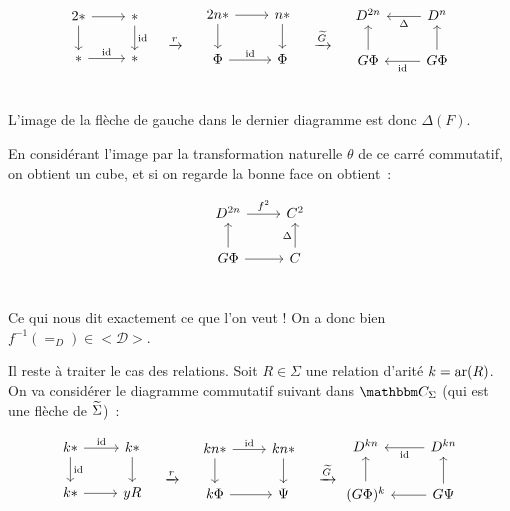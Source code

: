 \begin{pv}
    \[\begin{tikzcd}
        2\ast\arrow[r]\arrow[d] & \ast\arrow[d,"\id"] \\
        \ast\arrow[r, "\id"] & \ast \\
    \end{tikzcd}\quad\xrightarrow{r}\quad\begin{tikzcd}
        2n\ast\arrow[r]\arrow[d] & n\ast\arrow[d] \\
        \Phi\arrow[r,"\id"] & \Phi \\
    \end{tikzcd}\quad\xrightarrow{\tg}\quad\begin{tikzcd}
        D^{2n} & D^n\arrow[l,"\Delta"] \\
        G\Phi\arrow[u] & G\Phi\arrow[l,"\id"]\arrow[u] \\
    \end{tikzcd}\]

    L'image de la flèche de gauche dans le dernier diagramme est donc $\Delta(F)$.

    En considérant l'image par la transformation naturelle $\theta$ de ce carré commutatif,
    on obtient un cube, et si on regarde la bonne face on obtient~:

    \[\begin{tikzcd}
        D^{2n}\arrow[r, "f^2"] & C^2 \\
        G\Phi\arrow[u]\arrow[r] & C\arrow[u, "\Delta"] \\
    \end{tikzcd}\]

    Ce qui nous dit exactement ce que l'on veut ! On a donc bien
    $f^{-1}(=_D)\in <\mathcal{D}>$.

    Il reste à traiter le cas des relations. Soit $R\in\Sigma$ une relation d'arité
    $k = \text{ar}(R)$. On va considérer le diagramme commutatif suivant dans $\C_\Sigma$ (qui
    est une flèche de $\widetilde{\Sigma}$)~:

    \[\begin{tikzcd}
        k\ast\arrow[d, "\id"]\arrow[r,"\id"] & k\ast\arrow[d] \\
        k\ast\arrow[r]                       & yR \\
    \end{tikzcd}\quad\xrightarrow{r}\quad\begin{tikzcd}
        kn\ast\arrow[d]\arrow[r,"\id"] & kn\ast\arrow[d] \\
        k\Phi\arrow[r]                 & \Psi \\
    \end{tikzcd}\quad\xrightarrow{\tg}\begin{tikzcd}
        D^{kn} & D^{kn}\arrow[l, "\id"] \\
        (G\Phi)^k\arrow[u] & G\Psi\arrow[l]\arrow[u] \\
    \end{tikzcd}\]


\end{pv}
